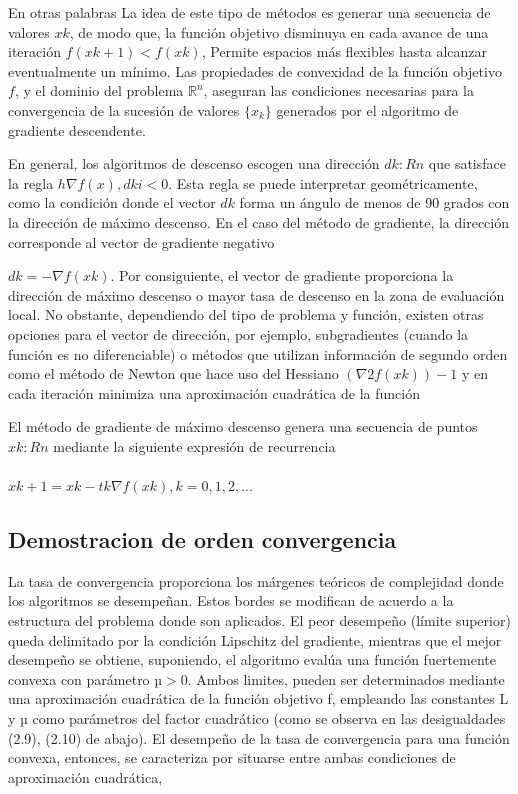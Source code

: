 \documentclass[conference]{IEEEtran}
\begin{document}
En otras palabras La idea de este tipo de métodos es generar una secuencia de valores \({xk}\), de modo que, la función objetivo disminuya en cada avance de una iteración \(f(xk+1) < f(xk)\), Permite espacios más flexibles hasta alcanzar eventualmente un mínimo. Las propiedades de convexidad de la función objetivo \( f\), y el dominio del problema \( \mathbb{R}^n\), aseguran las condiciones necesarias para la convergencia de la sucesión de valores \( \{x_k\} \) generados por el algoritmo de gradiente descendente. 

En general, los algoritmos de descenso escogen una dirección \(dk \colon Rn\) que satisface la regla \(h \nabla f(x), dki < 0\). Esta regla se puede interpretar geométricamente, como la condición donde el vector \(dk\) forma un ángulo de menos de 90 grados con la dirección de máximo descenso. En el caso del método de gradiente, la dirección corresponde al vector de gradiente negativo 


\(dk = - \nabla f(xk)\). Por consiguiente, el vector de gradiente proporciona la dirección de máximo descenso o mayor tasa de descenso en la zona de evaluación local. No obstante, dependiendo del tipo de problema y función, existen otras opciones para el vector de dirección, por ejemplo, subgradientes (cuando la función es no diferenciable) o métodos que utilizan información de segundo orden como el método de Newton que hace uso del Hessiano \((\nabla2f(xk)) - 1\) y en cada iteración minimiza una aproximación cuadrática de la función

El método de gradiente de máximo descenso genera una secuencia de puntos 
\({xk} \colon Rn\) mediante la siguiente expresión de recurrencia \\\\
\(xk+1 = xk - tk\nabla f(xk), k = 0, 1, 2, ... \)

\subsection{Demostracion de orden convergencia}
La tasa de convergencia proporciona los márgenes teóricos de complejidad donde los algoritmos se desempeñan. Estos bordes se modifican de acuerdo a la estructura del problema donde son aplicados. El peor desempeño (límite superior) queda delimitado por la condición Lipschitz del gradiente, mientras que el mejor desempeño se obtiene, suponiendo, el algoritmo evalúa una función fuertemente convexa con parámetro \(µ > 0\). Ambos limites, pueden ser
determinados mediante una aproximación cuadrática de la función objetivo f, empleando las constantes L y µ como parámetros del factor cuadrático (como se observa en las desigualdades (2.9), (2.10) de abajo). El desempeño de la tasa de convergencia para una función convexa, entonces, se caracteriza por situarse entre ambas condiciones de aproximación cuadrática,
 
\end{document}
